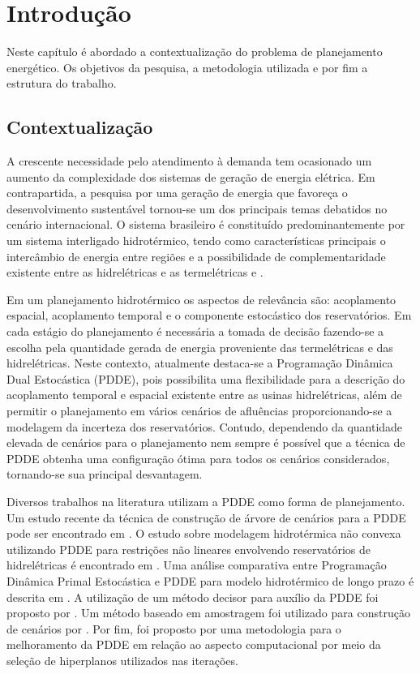 \chapter{Introdução}
Neste cap\'itulo \'e abordado a contextualiza\c c\~ao do problema de planejamento energ\'etico. Os objetivos da
 pesquisa, a metodologia utilizada e por fim a estrutura do trabalho. 
\section{Contextualiza\c c\~ao}
A crescente necessidade pelo atendimento \`a demanda tem ocasionado um aumento da complexidade dos
sistemas de gera\c c\~ao de energia el\'etrica. Em contrapartida, a pesquisa por uma gera\c c\~ao de energia que favore\c
ca o desenvolvimento sustent\'avel tornou-se um dos principais temas debatidos no cen\'ario internacional.
O sistema brasileiro \'e constitu\'ido predominantemente por um sistema interligado
hidrot\'ermico, tendo como caracter\'isticas principais o interc\^ambio de energia entre regi\~oes e a possibilidade de
complementaridade existente entre as hidrel\'etricas e as termel\'etricas \cite{tom} e \cite{an}. 

Em um planejamento hidrot\'ermico os aspectos
de relev\^ancia s\~ao: acoplamento espacial, acoplamento temporal e o componente estoc\'astico dos reservat\'orios. Em cada
est\'agio do planejamento \'e necess\'aria a tomada de decis\~ao fazendo-se a escolha pela quantidade gerada de energia
proveniente das termel\'etricas e das hidrel\'etricas. Neste
contexto, atualmente destaca-se a Programa\c c\~ao Din\^amica Dual
Estoc\'astica (PDDE), pois possibilita uma flexibilidade para a descri\c c\~ao do acoplamento temporal e espacial existente entre as
usinas hidrel\'etricas, al\'em de permitir o  planejamento em v\'arios cen\'arios de aflu\^encias proporcionando-se a
modelagem da incerteza dos reservat\'orios. Contudo, dependendo da quantidade elevada de cen\'arios  para o planejamento
nem sempre \'e poss\'ivel que a t\'ecnica de PDDE obtenha uma configura\c c\~ao \'otima para todos os cen\'arios
considerados, tornando-se sua principal desvantagem.

Diversos trabalhos na literatura utilizam a PDDE como forma de planejamento. Um estudo recente da t\'ecnica
de constru\c c\~ao de \'arvore de cen\'arios para a PDDE pode ser encontrado em \cite{Reben}.
O estudo sobre modelagem hidrot\'ermica n\~ao convexa utilizando PDDE para restri\c c\~oes n\~ao lineares envolvendo reservat\'orios de
hidrel\'etricas \'e encontrado em \cite{torres}.
Uma an\'alise comparativa entre Programa\c c\~ao Din\^amica Primal Estoc\'astica e PDDE para modelo
hidrot\'ermico de longo prazo \'e descrita em \cite{soares}. A utiliza\c c\~ao de um m\'etodo decisor para aux\'ilio da
PDDE foi proposto por \cite{vitor}. Um m\'etodo baseado em amostragem foi utilizado para constru\c c\~ao de cen\'arios
por \cite{homem}. Por fim, foi proposto por \cite{dematos} uma metodologia para o melhoramento da PDDE em rela\c c\~ao
ao aspecto computacional por meio da sele\c c\~ao de hiperplanos utilizados nas itera\c c\~oes. 

